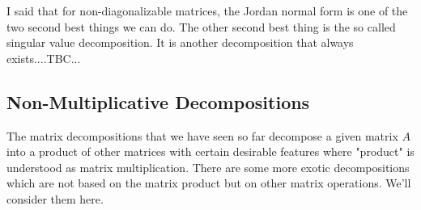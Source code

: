 I said that for non-diagonalizable matrices, the Jordan normal form is one of the two second best things we can do. The other second best thing is the so called singular value decomposition. It is another decomposition that always exists....TBC...














\subsection{Non-Multiplicative Decompositions}
The matrix decompositions that we have seen so far decompose a given matrix $A$ into a product of other matrices with certain desirable features where "product" is understood as matrix multiplication. There are some more exotic decompositions which are not based on the matrix product but on other matrix operations. We'll consider them here.

